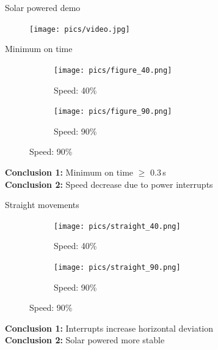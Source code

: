 \documentclass{beamer}
\begin{document}
\begin{frame}{Solar powered demo}
\begin{figure}
	\centering
	\texttt{[image: pics/video.jpg]}
\end{figure}
\end{frame}

\begin{frame}{Minimum on time}
	\vspace{0.5em}
	\vspace{-0.5em}
	\begin{figure}
		\centering
		\begin{subfigure}[b]{0.28\textwidth}
			\texttt{[image: pics/figure\_40.png]}
			\caption*{Speed: 40\%}
		\end{subfigure}
		\hspace{2em}
		\begin{subfigure}[b]{0.28\textwidth}
			\texttt{[image: pics/figure\_90.png]}
			\caption*{Speed: 90\%}
		\end{subfigure}
	\end{figure}
	\pause
	\vspace{0.5em}
	\textbf{Conclusion 1:} Minimum on time $\geq$ 0.3\,s \\
	\textbf{Conclusion 2:} Speed decrease due to power interrupts \\
\end{frame}

\begin{frame}{Straight movements}
	\vspace{0.5em}
	\vspace{-0.5em}
	\begin{figure}
		\centering
		\begin{subfigure}[b]{0.28\textwidth}
			\texttt{[image: pics/straight\_40.png]}
			\caption*{Speed: 40\%}
		\end{subfigure}
		\hspace{2em}
		\begin{subfigure}[b]{0.28\textwidth}
			\texttt{[image: pics/straight\_90.png]}
			\caption*{Speed: 90\%}
		\end{subfigure}
	\end{figure}
	\pause
	\vspace{0.5em}
	\textbf{Conclusion 1:} Interrupts increase horizontal deviation \\
	\textbf{Conclusion 2:} Solar powered more stable \\
\end{frame}
\end{document}
